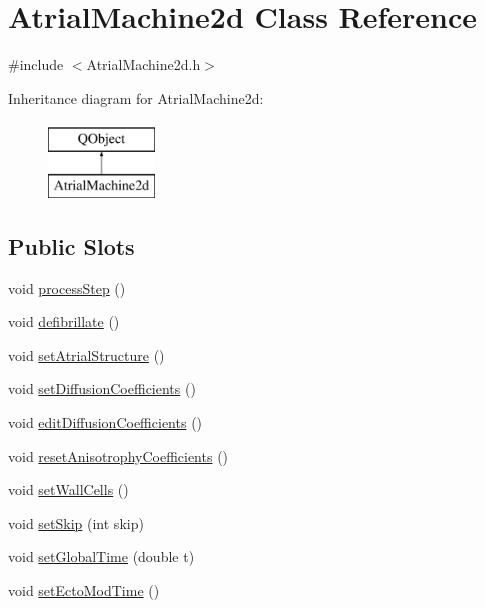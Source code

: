 \hypertarget{class_atrial_machine2d}{\section{Atrial\+Machine2d Class Reference}
\label{class_atrial_machine2d}
}


{\ttfamily \#include $<$Atrial\+Machine2d.\+h$>$}

Inheritance diagram for Atrial\+Machine2d\+:\begin{figure}[H]
\begin{center}
\leavevmode
\includegraphics[height=2.000000cm]{class_atrial_machine2d}
\end{center}
\end{figure}
\subsection*{Public Slots}
\begin{DoxyCompactItemize}
\item 
void \hyperlink{class_atrial_machine2d_ac298c084be8e7a01ec02bbdaea49c493}{process\+Step} ()
\item 
void \hyperlink{class_atrial_machine2d_a3d3d6a6bf238cbfa164370f9670b2b52}{defibrillate} ()
\item 
void \hyperlink{class_atrial_machine2d_a13ac636498a735f9d2df66d2cc4e78d5}{set\+Atrial\+Structure} ()
\item 
void \hyperlink{class_atrial_machine2d_a23d7a0f70a9ddda7dfffc13df9c9964a}{set\+Diffusion\+Coefficients} ()
\item 
void \hyperlink{class_atrial_machine2d_a75d9bb70add513fe3bed06c714842bff}{edit\+Diffusion\+Coefficients} ()
\item 
void \hyperlink{class_atrial_machine2d_a93fea96e747dab09689d38e0160b3761}{reset\+Anisotrophy\+Coefficients} ()
\item 
void \hyperlink{class_atrial_machine2d_ab1b354982cb55232744ae18365663a1e}{set\+Wall\+Cells} ()
\item 
void \hyperlink{class_atrial_machine2d_a5e5d865f2142795acca445437cc2346d}{set\+Skip} (int skip)
\item 
void \hyperlink{class_atrial_machine2d_abc84bef4b3b1a84a4959e820dea21fc3}{set\+Global\+Time} (double t)
\item 
void \hyperlink{class_atrial_machine2d_afeca8099f6767e7850ba1bd305dc9ed7}{set\+Ecto\+Mod\+Time} ()
\end{DoxyCompactItemize}
